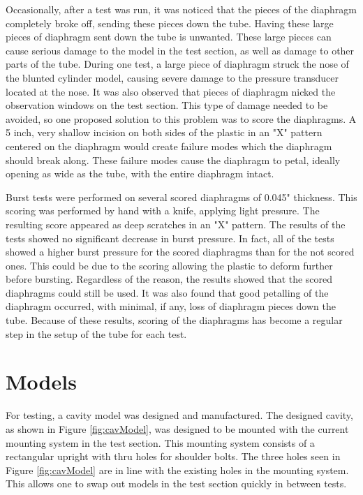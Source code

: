 Occasionally, after a test was run, it was noticed that the pieces of the diaphragm completely broke off, sending these pieces down the tube. Having these large pieces of diaphragm sent down the tube is unwanted. These large pieces can cause serious damage to the model in the test section, as well as damage to other parts of the tube. During one test, a large piece of diaphragm struck the nose of the blunted cylinder model, causing severe damage to the pressure transducer located at the nose. It was also observed that pieces of diaphragm nicked the observation windows on the test section. This type of damage needed to be avoided, so one proposed solution to this problem was to score the diaphragms. A 5 inch, very shallow incision on both sides of the plastic in an "X" pattern centered on the diaphragm would create failure modes which the diaphragm should break along. These failure modes cause the diaphragm to petal, ideally opening as wide as the tube, with the entire diaphragm intact. 

Burst tests were performed on several scored diaphragms of 0.045" thickness.  This scoring was performed by hand with a knife, applying light pressure. The resulting score appeared as deep scratches in an "X" pattern. The results of the tests showed no significant decrease in burst pressure. In fact, all of the tests showed a higher burst pressure for the scored diaphragms than for the not scored ones. This could be due to the scoring allowing the plastic to deform further before bursting. Regardless of the reason, the results showed that the scored diaphragms could still be used. It was also found that good petalling of the diaphragm occurred, with minimal, if any, loss of diaphragm pieces down the tube. Because of these results, scoring of the diaphragms has become a regular step in the setup of the tube for each test.  





\section{Models}

For testing, a cavity model was designed and manufactured. The designed cavity, as shown in Figure \ref{fig:cavModel}, was designed to be mounted with the current mounting system in the test section. This mounting system consists of a rectangular upright with thru holes for shoulder bolts. The three holes seen in Figure \ref{fig:cavModel} are in line with the existing holes in the mounting system. This allows one to swap out models in the test section quickly in between tests. 


